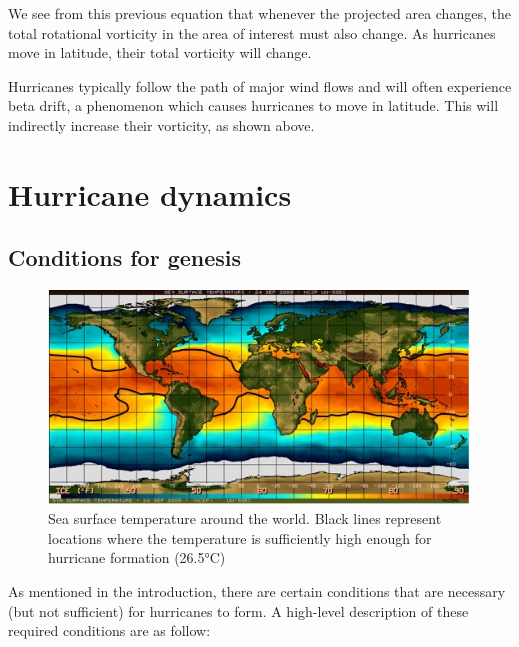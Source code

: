 We see from this previous equation that whenever the projected area changes, the total rotational vorticity in the area of interest must also change. As hurricanes move in latitude, their total vorticity will change.

Hurricanes typically follow the path of major wind flows and will often experience beta drift, a phenomenon which causes hurricanes to move in latitude. This will indirectly increase their vorticity, as shown above.
\section{Hurricane dynamics}

\subsection{Conditions for genesis}
\begin{figure}
    \centering
    \includegraphics[width=0.7\linewidth]{assets/SSTforGlobalOcean1.jpg}
    \caption{Sea surface temperature around the world. Black lines represent locations where the temperature is sufficiently high enough for hurricane formation (26.5°C)}
    \label{fig:temp}
\end{figure}
As mentioned in the introduction, there are certain conditions that are necessary (but not sufficient) for hurricanes to form. A high-level description of these required conditions are as follow:
